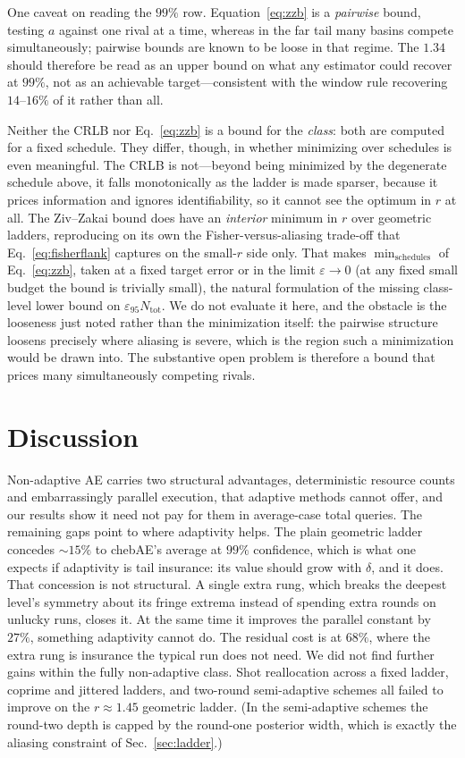 \documentclass[%
 twocolumn,
 amsmath,amssymb,
prx,
longbibliography
]{revtex4-2}
\newcommand{\Ntot}{N_{\mathrm{tot}}}
\begin{document}
One caveat on reading the $99\%$ row. Equation~\eqref{eq:zzb} is a \emph{pairwise} bound, testing $a$ against one rival at a time, whereas in the far tail many basins compete simultaneously; pairwise bounds are known to be loose in that regime. The $1.34$ should therefore be read as an upper bound on what any estimator could recover at $99\%$, not as an achievable target---consistent with the window rule recovering $14$--$16\%$ of it rather than all.

Neither the \ac{CRLB} nor Eq.~\eqref{eq:zzb} is a bound for the \emph{class}: both are computed for a fixed schedule. They differ, though, in whether minimizing over schedules is even meaningful. The \ac{CRLB} is not---beyond being minimized by the degenerate schedule above, it falls monotonically as the ladder is made sparser, because it prices information and ignores identifiability, so it cannot see the optimum in $r$ at all. The Ziv--Zakai bound does have an \emph{interior} minimum in $r$ over geometric ladders, reproducing on its own the Fisher-versus-aliasing trade-off that Eq.~\eqref{eq:fisherflank} captures on the small-$r$ side only. That makes $\min_{\text{schedules}}$ of Eq.~\eqref{eq:zzb}, taken at a fixed target error or in the limit $\varepsilon \to 0$ (at any fixed small budget the bound is trivially small), the natural formulation of the missing class-level lower bound on $\varepsilon_{95}\Ntot$. We do not evaluate it here, and the obstacle is the looseness just noted rather than the minimization itself: the pairwise structure loosens precisely where aliasing is severe, which is the region such a minimization would be drawn into. The substantive open problem is therefore a bound that prices many simultaneously competing rivals.

\section{Discussion}\label{sec:discussion}

Non-adaptive \ac{AE} carries two structural advantages, deterministic resource counts and embarrassingly parallel execution, that adaptive methods cannot offer, and our results show it need not pay for them in average-case total queries. The remaining gaps point to where adaptivity helps. The plain geometric ladder concedes $\sim 15\%$ to chebAE's average at $99\%$ confidence, which is what one expects if adaptivity is tail insurance: its value should grow with $\delta$, and it does. That concession is not structural. A single extra rung, which breaks the deepest level's symmetry about its fringe extrema instead of spending extra rounds on unlucky runs, closes it. At the same time it improves the parallel constant by $27\%$, something adaptivity cannot do. The residual cost is at $68\%$, where the extra rung is insurance the typical run does not need. We did not find further gains within the fully non-adaptive class. Shot reallocation across a fixed ladder, coprime and jittered ladders, and two-round semi-adaptive schemes all failed to improve on the $r \approx 1.45$ geometric ladder. (In the semi-adaptive schemes the round-two depth is capped by the round-one posterior width, which is exactly the aliasing constraint of Sec.~\ref{sec:ladder}.)
\end{document}
